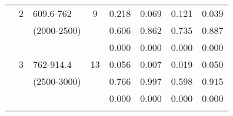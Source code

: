 \begin{table}[p]
\begin{tabular}{cclcllll}
                                                               & 2                                                              & 609.6-762                                                              & 9                                                                     & 0.218                                      & 0.069                                            & 0.121                                               & 0.039  \\ 
                                                               &                                                                 & (2000-2500)                                                           &                                                                        &  0.606                                     & 0.862                                            & 0.735                                               & 0.887  \\ 
                                                               &                                                                 &                                                                                &                                                                        & 0.000                                      & 0.000                                            & 0.000                                               & 0.000  \\ \cline{5-8}\noalign{\smallskip}
                                                               & 3                                                              & 762-914.4                                                              & 13                                                                   &  0.056                                     & 0.007                                            & 0.019                                               & 0.050  \\ 
                                                               &                                                                 & (2500-3000)                                                           &                                                                        & 0.766                                      & 0.997                                            & 0.598                                               & 0.915  \\ 
                                                               &                                                                 &                                                                                &                                                                        & 0.000                                      & 0.000                                            & 0.000                                               & 0.000  \\ \cline{5-8}\noalign{\smallskip}

\end{tabular}
\end{table}
